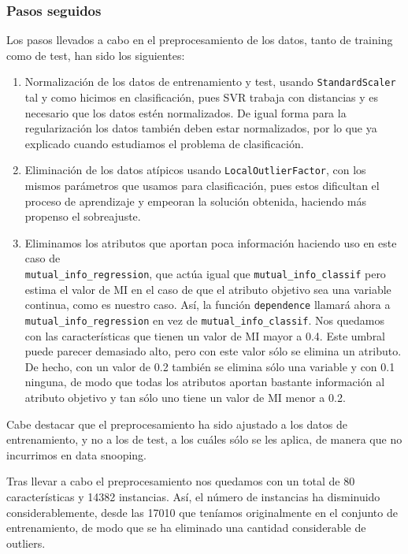 \documentclass[a4]{article}
\begin{document}
\subsubsection{Pasos seguidos}
Los pasos llevados a cabo en el preprocesamiento de los datos, tanto de training como de test, han sido los siguientes:
\begin{enumerate}
	\item Normalización de los datos de entrenamiento y test, usando \lstinline|StandardScaler| tal y como hicimos en clasificación, pues SVR trabaja con distancias y es necesario que los datos estén normalizados. De igual forma para la regularización los datos también deben estar normalizados, por lo que ya explicado cuando estudiamos el problema de clasificación. 
	\item  Eliminación de los datos atípicos usando \lstinline|LocalOutlierFactor|, con los mismos parámetros que usamos para clasificación, pues estos dificultan el proceso de aprendizaje y empeoran la solución obtenida, haciendo más propenso el sobreajuste. 
	\item Eliminamos los atributos que aportan poca información haciendo uso en este caso de\\ \lstinline|mutual_info_regression|, que actúa igual que \lstinline|mutual_info_classif| pero estima el valor de MI en el caso de que el atributo objetivo sea una variable continua, como es nuestro caso.
	Así, la función \lstinline|dependence| llamará ahora a \lstinline|mutual_info_regression| en vez de \lstinline|mutual_info_classif|. Nos quedamos con las características que tienen un valor de MI mayor a 0.4. Este umbral puede parecer demasiado alto, pero con este valor sólo se elimina un atributo. De hecho, con un valor de 0.2 también se elimina sólo una variable y con 0.1 ninguna, de modo que todas los atributos aportan bastante información al atributo objetivo y tan sólo uno tiene un valor de MI menor a 0.2.
\end{enumerate}

Cabe destacar que el preprocesamiento ha sido ajustado a los datos de entrenamiento, y no a los de test, a los cuáles sólo se les aplica, de manera que no incurrimos en data snooping. 

Tras llevar a cabo el preprocesamiento nos quedamos con un total de 80 características y 14382 instancias. Así, el número de instancias ha disminuido considerablemente, desde las 17010 que teníamos originalmente en el conjunto de entrenamiento, de modo que se ha eliminado una cantidad considerable de outliers. 
\end{document}
